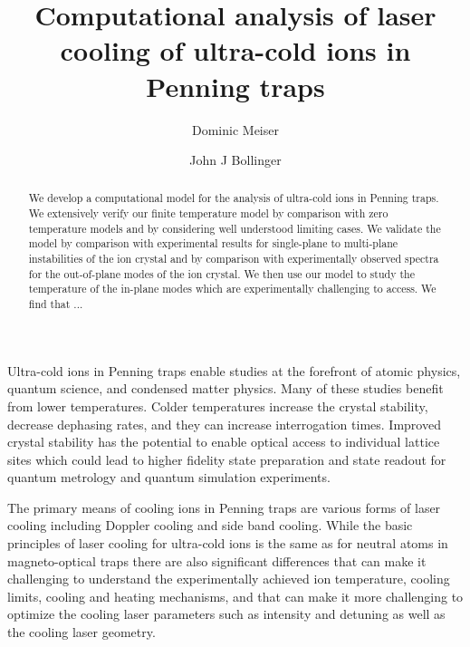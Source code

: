 \documentclass[aps, pra, twocolumn]{revtex4-1}
\begin{document}
\title{Computational analysis of laser cooling of ultra-cold ions
  in Penning traps
}

\author{Dominic Meiser}
\author{John J Bollinger}

\begin{abstract}
  We develop a computational model for the analysis of ultra-cold
  ions in Penning traps. We extensively verify our finite
  temperature model by comparison with zero temperature models
  and by considering well understood limiting cases. We validate
  the model by comparison with experimental results for
  single-plane to multi-plane instabilities of the ion crystal
  and by comparison with experimentally observed spectra for the
  out-of-plane modes of the ion crystal.
  We then use our model to study the temperature of the in-plane
  modes which are experimentally challenging to access. We find
  that ...
\end{abstract}

\maketitle


Ultra-cold ions in Penning traps enable studies at the forefront
of atomic physics, quantum
science, and condensed matter
physics. Many of these studies benefit from
lower temperatures. Colder temperatures increase the crystal
stability, decrease dephasing rates, and they can increase
interrogation times. Improved crystal stability has the potential
to enable optical access to individual lattice sites which could
lead to higher fidelity state preparation and state readout for quantum
metrology and quantum simulation
experiments.

The primary means of cooling ions in Penning traps are various
forms of laser cooling including Doppler cooling and side band
cooling. While the basic principles of laser cooling for
ultra-cold ions is the same as for neutral atoms in
magneto-optical traps there are also significant differences that
can make it challenging to understand the experimentally achieved
ion temperature, cooling limits, cooling and heating mechanisms,
and that can make it more challenging to optimize the cooling
laser parameters such as intensity and detuning as well as the
cooling laser geometry.
\end{document}
